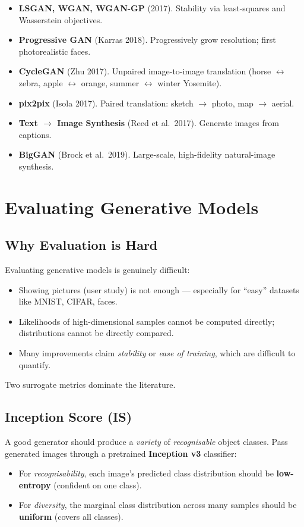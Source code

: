 \documentclass[11pt,a4paper]{article}
\theoremstyle{definition}
\theoremstyle{plain}
\theoremstyle{remark}
\begin{document}
\begin{itemize}
    \item \textbf{LSGAN, WGAN, WGAN-GP} (2017). Stability via least-squares and Wasserstein objectives.
    \item \textbf{Progressive GAN} (Karras 2018). Progressively grow resolution; first photorealistic faces.
    \item \textbf{CycleGAN} (Zhu 2017). Unpaired image-to-image translation (horse $\leftrightarrow$ zebra, apple $\leftrightarrow$ orange, summer $\leftrightarrow$ winter Yosemite).
    \item \textbf{pix2pix} (Isola 2017). Paired translation: sketch $\to$ photo, map $\to$ aerial.
    \item \textbf{Text $\to$ Image Synthesis} (Reed et al.\ 2017). Generate images from captions.
    \item \textbf{BigGAN} (Brock et al.\ 2019). Large-scale, high-fidelity natural-image synthesis.
\end{itemize}


\section{Evaluating Generative Models}

\subsection{Why Evaluation is Hard}

Evaluating generative models is genuinely difficult:
\begin{itemize}
    \item Showing pictures (user study) is not enough --- especially for ``easy'' datasets like MNIST, CIFAR, faces.
    \item Likelihoods of high-dimensional samples cannot be computed directly; distributions cannot be directly compared.
    \item Many improvements claim \emph{stability} or \emph{ease of training}, which are difficult to quantify.
\end{itemize}

Two surrogate metrics dominate the literature.

\subsection{Inception Score (IS)}

A good generator should produce a \emph{variety} of \emph{recognisable} object classes. Pass generated images through a pretrained \textbf{Inception v3} classifier:
\begin{itemize}
    \item For \emph{recognisability}, each image's predicted class distribution should be \textbf{low-entropy} (confident on one class).
    \item For \emph{diversity}, the marginal class distribution across many samples should be \textbf{uniform} (covers all classes).
\end{itemize}
\end{document}
